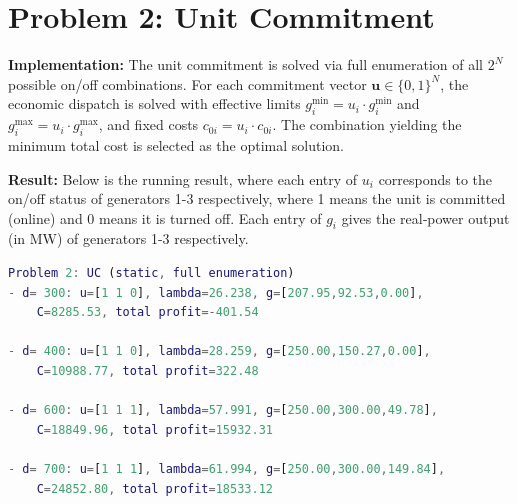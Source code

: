 \documentclass{article}
\begin{document}
\newpage
\section*{Problem 2: Unit Commitment}

\textbf{Implementation:} The unit commitment is solved via full enumeration of all $2^N$ possible on/off combinations. For each commitment vector $\mathbf{u} \in \{0,1\}^N$, the economic dispatch is solved with effective limits $g_i^{\min} = u_i \cdot g_i^{\min}$ and $g_i^{\max} = u_i \cdot g_i^{\max}$, and fixed costs $c_{0i} = u_i \cdot c_{0i}$. The combination yielding the minimum total cost is selected as the optimal solution.

\textbf{Result:} Below is the running result, where each entry of $u_i$ corresponds to the on/off status of generators 1-3 respectively, where 1 means the unit is committed (online) and 0 means it is turned off. Each entry of $g_i$ gives the real‑power output (in MW) of generators 1-3 respectively.

\begin{lstlisting}[language=Matlab]
Problem 2: UC (static, full enumeration)
- d= 300: u=[1 1 0], lambda=26.238, g=[207.95,92.53,0.00],
    C=8285.53, total profit=-401.54

- d= 400: u=[1 1 0], lambda=28.259, g=[250.00,150.27,0.00],
    C=10988.77, total profit=322.48

- d= 600: u=[1 1 1], lambda=57.991, g=[250.00,300.00,49.78],
    C=18849.96, total profit=15932.31

- d= 700: u=[1 1 1], lambda=61.994, g=[250.00,300.00,149.84],
    C=24852.80, total profit=18533.12
\end{lstlisting}
\end{document}
